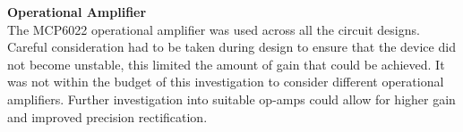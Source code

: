 \textbf{Operational Amplifier}\\
The MCP6022 operational amplifier was used across all the circuit designs. Careful consideration had to be taken during design to ensure that the device did not become unstable, this limited the amount of gain that could be achieved. It was not within the budget of this investigation to consider different operational amplifiers. Further investigation into suitable op-amps could allow for higher gain and improved precision rectification.















